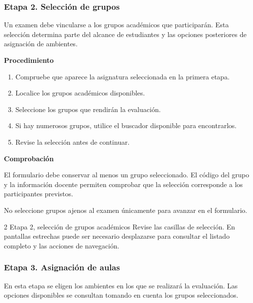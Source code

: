 \subsubsection{Etapa 2. Selección de grupos}

Un examen debe vincularse a los grupos académicos
que participarán. Esta selección determina parte
del alcance de estudiantes y las opciones posteriores
de asignación de ambientes.

\noindent\textbf{Procedimiento}

\begin{enumerate}
    \item Compruebe que aparece la asignatura
    seleccionada en la primera etapa.

    \item Localice los grupos académicos disponibles.

    \item Seleccione los grupos que rendirán
    la evaluación.

    \item Si hay numerosos grupos, utilice
    el buscador disponible para encontrarlos.

    \item Revise la selección antes de continuar.
\end{enumerate}

\noindent\textbf{Comprobación}

El formulario debe conservar al menos un grupo
seleccionado. El código del grupo y la información
docente permiten comprobar que la selección
corresponde a los participantes previstos.

No seleccione grupos ajenos al examen únicamente
para avanzar en el formulario.

\CapturasRegistro
{2}
{Etapa 2, selección de grupos académicos}
{Revise las casillas de selección.
En pantallas estrechas puede ser necesario
desplazarse para consultar el listado completo
y las acciones de navegación.}


\subsubsection{Etapa 3. Asignación de aulas}

En esta etapa se eligen los ambientes en los
que se realizará la evaluación. Las opciones
disponibles se consultan tomando en cuenta
los grupos seleccionados.

